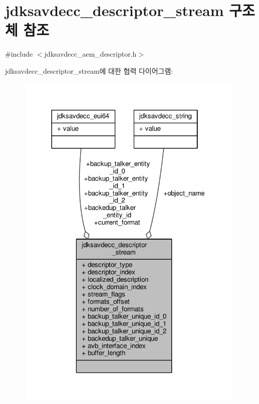 \hypertarget{structjdksavdecc__descriptor__stream}{}\section{jdksavdecc\+\_\+descriptor\+\_\+stream 구조체 참조}
\label{structjdksavdecc__descriptor__stream}


{\ttfamily \#include $<$jdksavdecc\+\_\+aem\+\_\+descriptor.\+h$>$}



jdksavdecc\+\_\+descriptor\+\_\+stream에 대한 협력 다이어그램\+:
\nopagebreak
\begin{figure}[H]
\begin{center}
\leavevmode
\includegraphics[width=310pt]{structjdksavdecc__descriptor__stream__coll__graph}
\end{center}
\end{figure}

